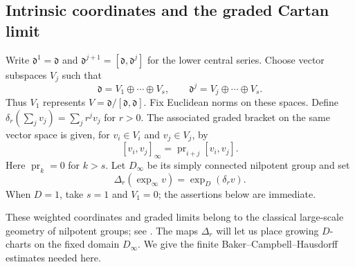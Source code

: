 \subsection{Intrinsic coordinates and the graded Cartan limit}

Write $\mathfrak d^1=\mathfrak d$ and
$\mathfrak d^{j+1}=[\mathfrak d,\mathfrak d^j]$ for the lower central
series.  Choose vector subspaces $V_j$ such that
\begin{equation}\label{eq:d-filtration-splitting}
 \mathfrak d=V_1\oplus\cdots\oplus V_s,
 \qquad \mathfrak d^j=V_j\oplus\cdots\oplus V_s.
\end{equation}
Thus $V_1$ represents $V=\mathfrak d/[\mathfrak d,\mathfrak d]$.
Fix Euclidean norms on these spaces.  Define
$\delta_r(\sum_j v_j)=\sum_j r^jv_j$ for $r>0$.  The associated
graded bracket on the same vector space is given, for $v_i\in V_i$
and $v_j\in V_j$, by
\[
 [v_i,v_j]_\infty=\operatorname{pr}_{i+j}[v_i,v_j].
\]
Here $\operatorname{pr}_k=0$ for $k>s$.
Let $D_\infty$ be its simply connected nilpotent group and set
\begin{equation}\label{eq:d-delta-definition}
 \Delta_r(\exp_\infty v)=\exp_D(\delta_r v).
\end{equation}
When $D=1$, take $s=1$ and $V_1=0$; the assertions below are immediate.

These weighted coordinates and graded limits belong to the classical
large-scale geometry of nilpotent groups; see
\cite{Guivarch1973,Pansu1983}. The maps $\Delta_r$ will let us place
growing $D$-charts on the fixed domain $D_\infty$. We give the finite
Baker--Campbell--Hausdorff estimates needed here.

